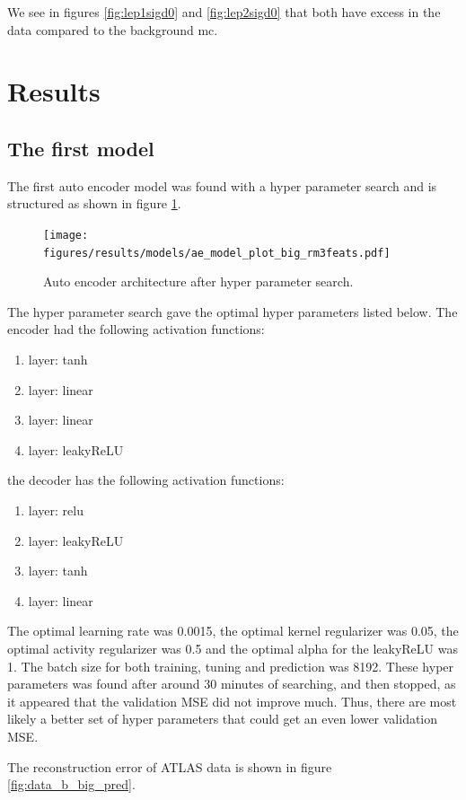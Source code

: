 \documentclass[ reprint, amsmath,amssymb, aps, nofootinbib]{revtex4-2}
\begin{document}
We see in figures \ref{fig:lep1sigd0} and \ref{fig:lep2sigd0} that both have excess in the data compared to the background mc. 


\section{Results}

\subsection{The first model}

The first auto encoder model was found with a hyper parameter search and is structured as shown in figure \ref{fig:big_ae_plot}. 

\begin{figure}[H]
    \centering
    \texttt{[image: figures/results/models/ae\_model\_plot\_big\_rm3feats.pdf]}
    \caption{Auto encoder architecture after hyper parameter search. }
    \label{fig:big_ae_plot}
\end{figure}
The hyper parameter search gave the optimal hyper parameters listed below. The encoder had the following activation functions:
\begin{enumerate}
    \item layer: tanh
    \item layer: linear
    \item layer: linear
    \item layer: leakyReLU
\end{enumerate}

the decoder has the following activation functions: 
\begin{enumerate}
    \item layer: relu
    \item layer: leakyReLU
    \item layer: tanh
    \item layer: linear
\end{enumerate}


The optimal learning rate was 0.0015, the optimal kernel regularizer was 0.05, the optimal activity regularizer was 0.5 and the optimal alpha for the leakyReLU was 1. The batch size for both training, tuning and prediction was 8192. These hyper parameters was found after around 30 minutes of searching, and then stopped, as it appeared that the validation MSE did not improve much. Thus, there are most likely a better set of hyper parameters that could get an even lower validation MSE. \par 
The reconstruction error of ATLAS data is shown in figure \ref{fig:data_b_big_pred}.
\end{document}
